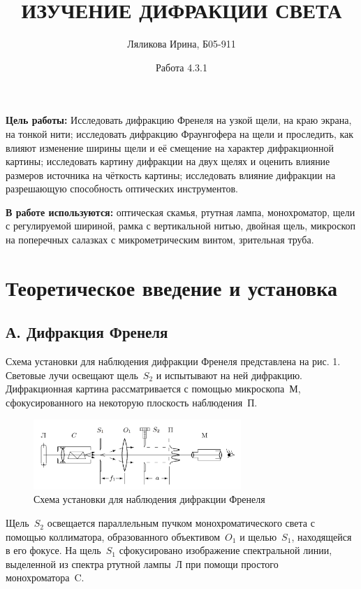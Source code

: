 \documentclass[a4paper,12pt]{article}
\title{ИЗУЧЕНИЕ ДИФРАКЦИИ СВЕТА}
\date{Работа 4.3.1}
\author{Ляликова Ирина, Б05-911}
\begin{document}
	
	\vspace{0.5 cm}
	\maketitle
	\vspace{0.5 cm}
	
	\textbf{Цель работы:} Исследовать дифракцию Френеля на узкой щели, на краю экрана, на тонкой нити; исследовать дифракцию Фраунгофера на щели и проследить, как влияют изменение ширины щели и её смещение на характер дифракционной картины; исследовать картину дифракции на двух щелях и оценить влияние размеров источника на чёткость картины; исследовать влияние дифракции на разрешающую способность оптических инструментов.
	
	\textbf{В работе используются:} оптическая скамья, ртутная лампа, монохроматор, щели с регулируемой шириной, рамка с вертикальной нитью, двойная щель, микроскоп на поперечных салазках с микрометрическим винтом, зрительная труба.
	
	\section*{Теоретическое введение и установка}
	\subsection*{А. Дифракция Френеля}
	
	Схема установки для наблюдения дифракции Френеля представлена на рис. 1. Световые лучи освещают щель~$S_2$ и испытывают на ней дифракцию. Дифракционная картина рассматривается с помощью микроскопа~М, сфокусированного на некоторую плоскость наблюдения~П.
		\begin{figure}[h]
		\begin{center}
			\includegraphics[width = 0.7\textwidth]{431-1.png}
			\caption{Схема установки для наблюдения дифракции Френеля}
		\end{center}
	\end{figure}
	
	Щель~$S_2$ освещается параллельным пучком монохроматического света с помощью коллиматора, образованного объективом~$O_1$ и щелью~$S_1$, находящейся в его фокусе. На щель~$S_1$ сфокусировано изображение спектральной линии, выделенной из спектра ртутной лампы~Л при помощи простого монохроматора~C.
	
\end{document}
